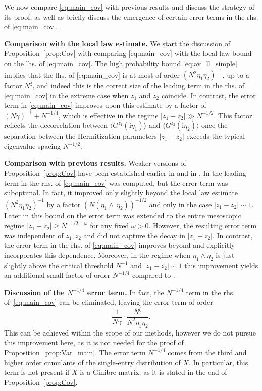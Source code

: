 \documentclass[10pt]{amsart}
\numberwithin{equation}{section}
\newcommand{\ii}{\mathrm{i}}
\begin{document}
We now compare \eqref{eq:main_cov} with previous results and discuss the strategy of its proof, as well as briefly discuss the emergence of certain error terms in the rhs. of \eqref{eq:main_cov}.

\smallskip

\textbf{Comparison with the local law estimate.} We start the discussion of Proposition~\ref{prop:Cov} with comparing \eqref{eq:main_cov} with the local law bound on the lhs. of \eqref{eq:main_cov}.  The high probability bound \eqref{eq:av_ll_simple} implies that the lhs. of \eqref{eq:main_cov} is at most of order $(N^2\eta_1\eta_2)^{-1}$, up to a  factor $N^\xi$, and indeed this is the correct size of the leading term in the rhs. of \eqref{eq:main_cov} in the extreme case when $z_1$ and $z_2$ coincide. In contrast, the error term in \eqref{eq:main_cov} improves upon this estimate by a factor of $(N\gamma)^{-1}+N^{-1/4}$, which is effective in the regime $|z_1-z_2|\gg N^{-1/2}$. This factor reflects the decorrelation between $\langle G^{z_1}(\ii\eta_1)\rangle$ and $\langle G^{z_2}(\ii\eta_2)\rangle$ once the separation between the Hermitization parameters $|z_1-z_2|$ exceeds the typical eigenvalue spacing $N^{-1/2}$.

\smallskip

\textbf{Comparison with previous results.} Weaker versions of Proposition~\ref{prop:Cov} have been established earlier in \cite[Proposition~3.3]{macroCLT_complex} and in \cite[Proposition~3.4]{Cipolloni_meso}. In \cite{macroCLT_complex} the leading term in the rhs. of \eqref{eq:main_cov} was computed, but the error term was suboptimal. In fact, it improved only slightly beyond the local law estimate $(N^2\eta_1\eta_2)^{-1}$ by a factor $(N(\eta_1\wedge~\!\eta_2))^{-1/2}$ and only in the case $|z_1-z_2|\sim 1$. Later in \cite{Cipolloni_meso} this bound on the error term was extended to the entire mesoscopic regime $|z_1-z_2|\ge N^{-1/2+\omega}$ for any fixed $\omega>0$. However, the resulting error term was independent of $z_1,z_2$ and did not capture the decay in $|z_1-z_2|$. In contrast, the error term in the rhs. of \eqref{eq:main_cov} improves beyond \cite[Proposition~3.4]{Cipolloni_meso} and explicitly incorporates this dependence. Moreover, in the regime when $\eta_1\wedge\eta_2$ is just slightly above the critical threshold $N^{-1}$ and $|z_1-z_2|\sim 1$ this improvement yields an additional small factor of order $N^{-1/4}$ compared to \cite{Cipolloni_meso}.

\smallskip

\textbf{Discussion of the $N^{-1/4}$ error term.} In fact, the $N^{-1/4}$ term in the rhs. of~\eqref{eq:main_cov} can be eliminated, leaving the error term of order
\begin{equation*}
\frac{1}{N\gamma}\cdot \frac{N^\xi}{N^2\eta_1\eta_2}.
\end{equation*}
This can be achieved within the scope of our methods, however we do not pursue this improvement here, as it is not needed for the proof of Proposition~\ref{prop:Var_main}. The error term $N^{-1/4}$ comes from the third and higher order cumulants of the single-entry distribution of $X$. In particular, this term is not present if $X$ is a Ginibre matrix, as it is stated in the end of Proposition~\ref{prop:Cov}.
\end{document}
